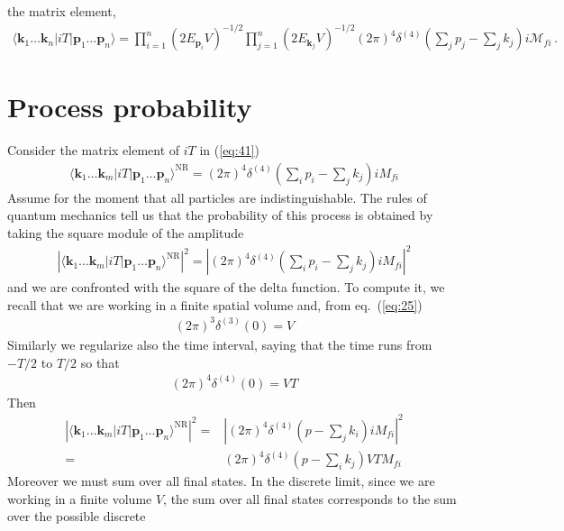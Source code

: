 the matrix element,
\begin{align}
  \label{eq:RMfi}
  \langle\mathbf{k}_1\ldots\mathbf{k}_n|i T|\mathbf{p}_1\ldots\mathbf{p}_n\rangle
=\prod_{i=1}^{n}\left(2E_{\mathbf{p}_i}V\right)^{-1/2}
\prod_{j=1}^{n}\left(2E_{\mathbf{k}_j}V\right)^{-1/2}(2\pi)^4\delta^{(4)}\left(\sum_j p_j-\sum_j k_j\right)i \mathcal{M}_{fi}\,.
\end{align}


\section{Process probability}
\label{sec:process-probability}
Consider the matrix element of $i T$ in (\ref{eq:41})
\begin{align}
  \label{eq:45}
  \langle\mathbf{k}_1\ldots\mathbf{k}_m|i T|\mathbf{p}_1\ldots\mathbf{p}_n\rangle^{\text{NR}}=(2\pi)^4\delta^{(4)}\left(\sum_i p_i-\sum_j k_j\right)i{M}_{fi}
\end{align}
Assume for the moment that all particles are indistinguishable. The rules of quantum mechanics  tell us that the probability of this process is obtained by taking the square module of the amplitude 
\begin{align}
   \left|  \langle\mathbf{k}_1\ldots\mathbf{k}_m|i T|\mathbf{p}_1\ldots\mathbf{p}_n\rangle^{\text{NR}}\right|^2=
\left|(2\pi)^4\delta^{(4)}\left(\sum_i p_i-\sum_j k_j\right)i {M}_{fi}\right|^2
\end{align}
and we are confronted with the square of the delta function. To compute it, we recall that we are working in a finite spatial volume and, from eq.~(\ref{eq:25})
\begin{align}
  (2\pi)^3\delta^{(3)}(0)=V
\end{align}
Similarly we regularize also the time interval, saying that the time runs from $-T/2$ to $T/2$ so that
\begin{align}
    (2\pi)^4\delta^{(4)}(0)=V T
\end{align}
Then
\begin{align}
\label{eq:47}
     \left|  \langle\mathbf{k}_1\ldots\mathbf{k}_m|i T|\mathbf{p}_1\ldots\mathbf{p}_n\rangle^{\text{NR}}\right|^2
     =&\left|(2\pi)^4\delta^{(4)}\left(p-\sum_j k_i\right)i {M}_{fi}\right|^2\nonumber\\
=&(2\pi)^4\delta^{(4)}\left(p-\sum_i k_j\right)V T  {M}_{fi}
\end{align}
Moreover we must sum over all final states. In the discrete limit, since we are
working in a finite volume $V$, the sum over all final states corresponds to  the sum over the possible discrete

